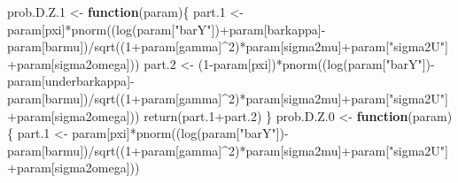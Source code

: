 \documentclass[
]{book}
\newenvironment{Shaded}{\begin{snugshade}}{\end{snugshade}}
\newcommand{\ControlFlowTok}[1]{\textcolor[rgb]{0.13,0.29,0.53}{\textbf{#1}}}
\newcommand{\DecValTok}[1]{\textcolor[rgb]{0.00,0.00,0.81}{#1}}
\newcommand{\FloatTok}[1]{\textcolor[rgb]{0.00,0.00,0.81}{#1}}
\newcommand{\FunctionTok}[1]{\textcolor[rgb]{0.00,0.00,0.00}{#1}}
\newcommand{\NormalTok}[1]{#1}
\newcommand{\OtherTok}[1]{\textcolor[rgb]{0.56,0.35,0.01}{#1}}
\newcommand{\SpecialCharTok}[1]{\textcolor[rgb]{0.00,0.00,0.00}{#1}}
\newcommand{\StringTok}[1]{\textcolor[rgb]{0.31,0.60,0.02}{#1}}
\theoremstyle{definition}
\theoremstyle{definition}
\theoremstyle{definition}
\theoremstyle{definition}
\theoremstyle{remark}
\begin{document}
\begin{Shaded}
\begin{Highlighting}[]
\NormalTok{prob.D.Z}\FloatTok{.1} \OtherTok{\textless{}{-}} \ControlFlowTok{function}\NormalTok{(param)\{}
\NormalTok{  part}\FloatTok{.1} \OtherTok{\textless{}{-}}\NormalTok{ param[}\StringTok{\textquotesingle{}pxi\textquotesingle{}}\NormalTok{]}\SpecialCharTok{*}\FunctionTok{pnorm}\NormalTok{((}\FunctionTok{log}\NormalTok{(param[}\StringTok{"barY"}\NormalTok{])}\SpecialCharTok{+}\NormalTok{param[}\StringTok{\textquotesingle{}barkappa\textquotesingle{}}\NormalTok{]}\SpecialCharTok{{-}}\NormalTok{param[}\StringTok{\textquotesingle{}barmu\textquotesingle{}}\NormalTok{])}\SpecialCharTok{/}\FunctionTok{sqrt}\NormalTok{((}\DecValTok{1}\SpecialCharTok{+}\NormalTok{param[}\StringTok{\textquotesingle{}gamma\textquotesingle{}}\NormalTok{]}\SpecialCharTok{\^{}}\DecValTok{2}\NormalTok{)}\SpecialCharTok{*}\NormalTok{param[}\StringTok{\textquotesingle{}sigma2mu\textquotesingle{}}\NormalTok{]}\SpecialCharTok{+}\NormalTok{param[}\StringTok{"sigma2U"}\NormalTok{]}\SpecialCharTok{+}\NormalTok{param[}\StringTok{\textquotesingle{}sigma2omega\textquotesingle{}}\NormalTok{]))}
\NormalTok{  part}\FloatTok{.2} \OtherTok{\textless{}{-}}\NormalTok{ (}\DecValTok{1}\SpecialCharTok{{-}}\NormalTok{param[}\StringTok{\textquotesingle{}pxi\textquotesingle{}}\NormalTok{])}\SpecialCharTok{*}\FunctionTok{pnorm}\NormalTok{((}\FunctionTok{log}\NormalTok{(param[}\StringTok{"barY"}\NormalTok{])}\SpecialCharTok{{-}}\NormalTok{param[}\StringTok{\textquotesingle{}underbarkappa\textquotesingle{}}\NormalTok{]}\SpecialCharTok{{-}}\NormalTok{param[}\StringTok{\textquotesingle{}barmu\textquotesingle{}}\NormalTok{])}\SpecialCharTok{/}\FunctionTok{sqrt}\NormalTok{((}\DecValTok{1}\SpecialCharTok{+}\NormalTok{param[}\StringTok{\textquotesingle{}gamma\textquotesingle{}}\NormalTok{]}\SpecialCharTok{\^{}}\DecValTok{2}\NormalTok{)}\SpecialCharTok{*}\NormalTok{param[}\StringTok{\textquotesingle{}sigma2mu\textquotesingle{}}\NormalTok{]}\SpecialCharTok{+}\NormalTok{param[}\StringTok{"sigma2U"}\NormalTok{]}\SpecialCharTok{+}\NormalTok{param[}\StringTok{\textquotesingle{}sigma2omega\textquotesingle{}}\NormalTok{]))}
  \FunctionTok{return}\NormalTok{(part}\FloatTok{.1}\SpecialCharTok{+}\NormalTok{part}\FloatTok{.2}\NormalTok{)}
\NormalTok{\}}
\NormalTok{prob.D.Z}\FloatTok{.0} \OtherTok{\textless{}{-}} \ControlFlowTok{function}\NormalTok{(param)\{}
\NormalTok{  part}\FloatTok{.1} \OtherTok{\textless{}{-}}\NormalTok{ param[}\StringTok{\textquotesingle{}pxi\textquotesingle{}}\NormalTok{]}\SpecialCharTok{*}\FunctionTok{pnorm}\NormalTok{((}\FunctionTok{log}\NormalTok{(param[}\StringTok{"barY"}\NormalTok{])}\SpecialCharTok{{-}}\NormalTok{param[}\StringTok{\textquotesingle{}barmu\textquotesingle{}}\NormalTok{])}\SpecialCharTok{/}\FunctionTok{sqrt}\NormalTok{((}\DecValTok{1}\SpecialCharTok{+}\NormalTok{param[}\StringTok{\textquotesingle{}gamma\textquotesingle{}}\NormalTok{]}\SpecialCharTok{\^{}}\DecValTok{2}\NormalTok{)}\SpecialCharTok{*}\NormalTok{param[}\StringTok{\textquotesingle{}sigma2mu\textquotesingle{}}\NormalTok{]}\SpecialCharTok{+}\NormalTok{param[}\StringTok{"sigma2U"}\NormalTok{]}\SpecialCharTok{+}\NormalTok{param[}\StringTok{\textquotesingle{}sigma2omega\textquotesingle{}}\NormalTok{]))}

\end{Highlighting}
\end{Shaded}
\end{document}
